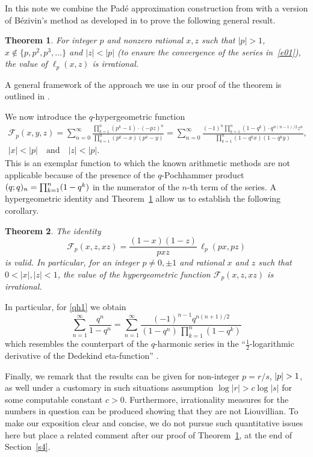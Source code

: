 \documentclass[12pt,reqno]{amsart}
\newtheorem{theorem}{Theorem}
\theoremstyle{remark}
\newcommand\cF{\mathcal{F}}
\begin{document}
In this note we combine the Pad\'e approximation construction from \cite{BZ08} with a version of B\'ezivin's method as developed in \cite{KRVZ09}
to prove the following general result.

\begin{theorem}
\label{th1}
For integer $p$ and nonzero rational $x,z$ such that $|p|>1$, $x\notin\{p,\allowbreak p^2,\allowbreak p^3,\dots\}$ and $|z|<|p|$
\textup(to ensure the convergence of the series in~\eqref{e01}\textup),
the value of $\ell_p(x,z)$ is irrational.
\end{theorem}

A general framework of the approach we use in our proof of the theorem is outlined in \cite{Zu15}.

We now introduce the $q$-hypergeometric function
\begin{gather}
\cF_p(x,y,z)=\sum_{n=0}^\infty\frac{\prod_{k=1}^n(p^k-1)\cdot(-pz)^n}{\prod_{k=1}^n(p^k-x)(p^k-y)}
=\sum_{n=0}^\infty\frac{(-1)^n\prod_{k=1}^n(1-q^k)\cdot q^{n(n-1)/2}z^n}{\prod_{k=1}^n(1-q^kx)(1-q^ky)},
\label{e01b}
\\
|x|<|p| \quad\text{and}\quad |z|<|p|.
\nonumber
\end{gather}
This is an exemplar function to which the known arithmetic methods \cite{AKV01,Be88} are not applicable because of the presence
of the $q$-Pochhammer product $(q;q)_n=\prod_{k=1}^n(1-\nobreak q^k)$ in the numerator of the $n$-th term of the series.
A hypergeometric identity and Theorem~\ref{th1} allow us to establish the following corollary.

\begin{theorem}
\label{th2}
The identity
\begin{equation}
\cF_p(x,z,xz)=\frac{(1-x)(1-z)}{pxz}\,\ell_p(px,pz)
\label{e01c}
\end{equation}
is valid. In particular, for an integer $p\ne0,\pm1$ and rational $x$ and $z$ such that
$0<|x|,|z|<1$, the value of the hypergeometric function $\cF_p(x,z,xz)$ is irrational.
\end{theorem}

In particular, for \eqref{qh1} we obtain
$$
\sum_{n=1}^\infty\frac{q^n}{1-q^n}=\sum_{n=1}^\infty\frac{(-1)^{n-1}q^{n(n+1)/2}}{(1-q^n)\,\prod_{k=1}^n(1-q^k)}
$$
which resembles the counterpart of the $q$-harmonic series in the ``$\frac12$-logarithmic derivative of the Dedekind eta-function'' \cite[Remark on p.~952]{Za01}.

Finally, we remark that the results can be given for non-integer $p=r/s$, $|p|>\nobreak1$, as well under a customary in such situations assumption
$\log|r|>c\log|s|$ for some computable constant $c>0$. Furthermore, irrationality measures for the numbers in question can be produced
showing that they are not Liouvillian.
To make our exposition clear and concise, we do not pursue such quantitative issues here but place a related comment after our proof
of Theorem~\ref{th1}, at the end of Section~\ref{s4}.
\end{document}
